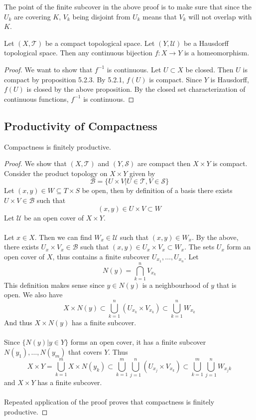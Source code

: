 The point of the finite subcover in the above proof is to make sure that since the $U_k$ are covering $K$, $V_k$ being disjoint from $U_k$ means that $V_k$ will not overlap with $K$. 

\begin{prp}{}{} Let $(X,\mathcal{T})$ be a compact topological space. Let $(Y,\mathcal{U})$ be a Hausdorff topological space. Then any continuous bijection $f:X\to Y$ is a homeomorphism. \tcbline
\begin{proof}
We want to show that $f^{-1}$ is continuous. Let $U\subset X$ be closed. Then $U$ is compact by proposition 5.2.3. By 5.2.1, $f(U)$ is compact. Since $Y$ is Hausdorff, $f(U)$ is closed by the above proposition. By the closed set characterization of continuous functions, $f^{-1}$ is continuous. 
\end{proof}
\end{prp}

\subsection{Productivity of Compactness}
\begin{prp}{}{} Compactness is finitely productive. \tcbline
\begin{proof}
We show that $(X,\mathcal{T})$ and $(Y,\mathcal{S})$ are compact then $X\times Y$ is compact. Consider the product topology on $X\times Y$ given by $$\mathcal{B}=\{U\times V|U\in\mathcal{T},V\in\mathcal{S}\}$$ Let $(x,y)\in W\subseteq T\times S$ be open, then by definition of a basis there exists $U\times V\in\mathcal{B}$ such that $$(x,y)\in U\times V\subset W$$ Let $\mathcal{U}$ be an open cover of $X\times Y$. \\~\\
Let $x\in X$. Then we can find $W_x\in\mathcal{U}$ such that $(x,y)\in W_x$. By the above, there exists $U_x\times V_x\in\mathcal{B}$ such that $(x,y)\in U_x\times V_x\subset W_x$. The sets $U_x$ form an open cover of $X$, thus contains a finite subcover $U_{x_1},\dots,U_{x_n}$. Let $$N(y)=\bigcap_{k=1}^nV_{x_k}$$ This definition makes sense since $y\in N(y)$ is a neighbourhood of $y$ that is open. We also have $$X\times N(y)\subset\bigcup_{k=1}^n(U_{x_k}\times V_{x_k})\subset\bigcup_{k=1}^nW_{x_k}$$ And thus $X\times N(y)$ has a finite subcover. \\~\\
Since $\{N(y)|y\in Y\}$ forms an open cover, it has a finite subcover $N(y_1),\dots,N(y_m)$ that covers $Y$. Thus $$X\times Y=\bigcup_{k=1}^mX\times N(y_k)\subset\bigcup_{k=1}^m\bigcup_{j=1}^n(U_{x_j}\times V_{x_k})\subset\bigcup_{k=1}^m\bigcup_{j=1}^nW_{x_jk}$$ and $X\times Y$ has a finite subcover. \\~\\
Repeated application of the proof proves that compactness is finitely productive. 
\end{proof}
\end{prp}

